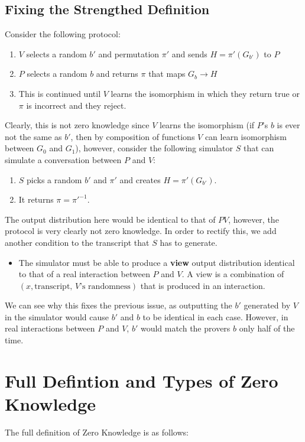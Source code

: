 \documentclass[11pt]{article}
\begin{document}
\subsection{Fixing the Strengthed Definition}
Consider the following protocol:
\begin{enumerate}
    \item $V$ selects a random $b'$ and permutation $\pi'$ and sends $H = \pi'(G_{b'})$ to $P$
    \item $P$ selects a random $b$ and returns $\pi$ that maps $G_b \rightarrow H$
    \item This is continued until $V$ learns the isomorphism in which they return true or $\pi$ is incorrect and they reject.
\end{enumerate}
Clearly, this is not zero knowledge since $V$ learns the isomorphism (if $P$'s $b$ is ever not the same as $b'$, then by composition of functions $V$ can learn isomorphism between $G_0$ and $G_1$), however, consider the following simulator $S$ that can simulate a conversation between $P$ and $V$:
\begin{enumerate}
    \item $S$ picks a random $b'$ and $\pi'$ and creates $H = \pi'(G_{b'})$.
    \item It returns $\pi = \pi'^{-1}$.
\end{enumerate}
The output distribution here would be identical to that of $PV$, however, the protocol is very clearly not zero knowledge. In order to rectify this, we add another condition to the transcript that $S$ has to generate.
\begin{itemize}
\item The simulator must be able to produce a \textbf{view} output distribution identical to that of a real interaction between $P$ and $V$. A view is a combination of $(x,\text{transcript, }V\text{'s randomness})$ that is produced in an interaction.
\end{itemize}
We can see why this fixes the previous issue, as outputting the $b'$ generated by $V$ in the simulator would cause $b'$ and $b$ to be identical in each case. However, in real interactions between $P$ and $V$, $b'$ would match the provers $b$ only half of the time.

\section{Full Defintion and Types of Zero Knowledge}
The full definition of Zero Knowledge is as follows:
\end{document}
